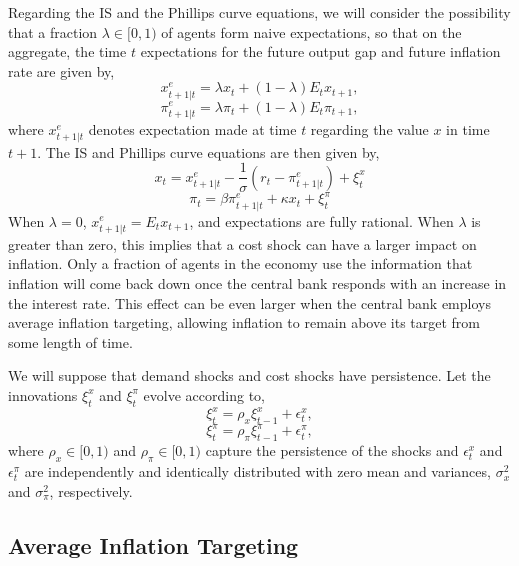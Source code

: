 \documentclass[english,authoryear,12pt]{elsarticle}
\begin{document}
Regarding the IS and the Phillips curve equations, we will consider the possibility that a fraction $\lambda \in [0,1)$ of agents form naive expectations, so that on the aggregate, the time $t$ expectations for the future output gap and future inflation rate are given by,
\begin{equation}\label{eq:xe}
	x_{t+1|t}^e = \lambda x_t + (1-\lambda) E_t x_{t+1},
\end{equation}
\begin{equation}\label{eq:pie}
	\pi_{t+1|t}^e = \lambda \pi_t + (1-\lambda) E_t \pi_{t+1},
\end{equation}
where $x_{t+1|t}^e$ denotes expectation made at time $t$ regarding the value $x$ in time $t+1$. The IS and Phillips curve equations are then given by,
\begin{equation}\label{eq:ISe}
	x_t = x_{t+1|t}^e - \frac{1}{\sigma} \left( r_t - \pi_{t+1|t}^e \right) + \xi_t^{x}
\end{equation}
\begin{equation}\label{eq:PhillipsCurvee}
	\pi_t = \beta \pi_{t+1|t}^e + \kappa x_t + \xi_t^{\pi}
\end{equation}
When $\lambda=0$, $x_{t+1|t}^e = E_t x_{t+1}$, and expectations are fully rational. When $\lambda$ is greater than zero, this implies that a cost shock can have a larger impact on inflation. Only a fraction of agents in the economy use the information that inflation will come back down once the central bank responds with an increase in the interest rate. This effect can be even larger when the central bank employs average inflation targeting, allowing inflation to remain above its target from some length of time.

We will suppose that demand shocks and cost shocks have persistence. Let the innovations $\xi_t^x$ and $\xi_t^\pi$ evolve according to,
\begin{equation}\label{eq:demandshock}
	\xi_t^x = \rho_x \xi_{t-1}^x + \epsilon_t^x,
\end{equation}
\begin{equation}\label{eq:costshock}
	\xi_t^\pi = \rho_\pi \xi_{t-1}^\pi + \epsilon_t^\pi,
\end{equation}
where $\rho_x\in [0,1)$ and $\rho_\pi \in [0,1)$ capture the persistence of the shocks and $\epsilon_t^x$ and $\epsilon_t^\pi$ are independently and identically distributed with zero mean and variances, $\sigma_x^2$ and $\sigma_\pi^2$, respectively.

\subsection{Average Inflation Targeting}
\end{document}

